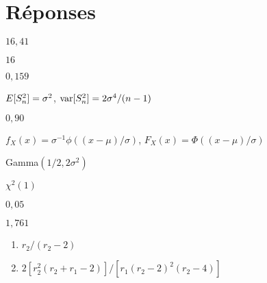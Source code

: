 \bigskip
\section*{Réponses}

\begin{reponse}{2.1}
    $16,41$
  
\end{reponse}
\begin{reponse}{2.2}
    $16$
  
\end{reponse}
\begin{reponse}{2.3}
    $0,159$
  
\end{reponse}
\begin{reponse}{2.5}
    $E [ S^2_n ] = \sigma^2$, $\mathrm{var} [ S^2_n ] = 2 \sigma^4/(n-1)$
  
\end{reponse}
\begin{reponse}{2.6}
    $0,90$
  
\end{reponse}
\begin{reponse}{2.8}
    $f_X(x) = \sigma^{-1} \phi((x - \mu)/\sigma)$, %
    $F_X(x) = \Phi((x - \mu)/\sigma)$
  
\end{reponse}
\begin{reponse}{2.10}
    \begin{inparaenum}
    \item Gamma$(1/2, 2\sigma^2)$
    \item $\chi^2(1)$
    \end{inparaenum}
  
\end{reponse}
\begin{reponse}{2.11}
    $0,05$
  
\end{reponse}
\begin{reponse}{2.12}
    $1,761$
  
\end{reponse}
\begin{reponse}{2.13}
   \begin{enumerate}
    \item $r_2/(r_2 - 2)$
    \item $2 [r_2^2 (r_2 + r_1 - 2)]/[r_1 (r_2 - 2)^2 (r_2 - 4)]$
    \end{enumerate}
  
\end{reponse}
